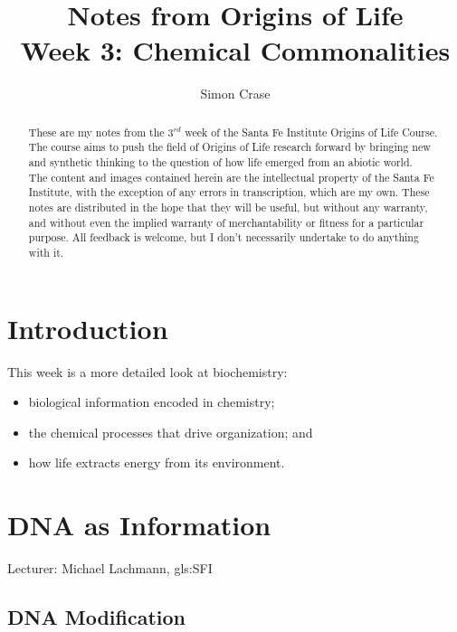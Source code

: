 \documentclass[]{article}
\title{
	Notes from Origins of Life\\
	Week 3: Chemical Commonalities
}
\author{Simon Crase}
\begin{document}
\maketitle

\begin{abstract}
 	These are my notes from the $3^{rd}$ week of the Santa Fe Institute Origins of Life Course\cite{sfi2020}. The course aims to push the field of Origins of Life research forward by bringing new and synthetic thinking to the question of how life emerged from an abiotic world.\\
  	The content and images contained herein are the intellectual property of the Santa Fe Institute, with the exception of any errors in transcription, which are my own.
  	These notes are distributed in the hope that they will be useful,
  	but without any warranty, and without even the implied warranty of
  	merchantability or fitness for a particular purpose. All feedback is welcome,
  	but I don't necessarily undertake to do anything with it.
\end{abstract}

\setcounter{tocdepth}{2}
\tableofcontents

\listoffigures

\section{Introduction}

This week is a more detailed look at biochemistry:\begin{itemize}
	\item  biological information encoded in chemistry;
	\item the chemical processes that drive organization; and
	\item  how life extracts energy from its environment.
\end{itemize}

\section{DNA as Information}
Lecturer: Michael Lachmann, \gls{gls:SFI}

\subsection{DNA Modification}
\end{document}
